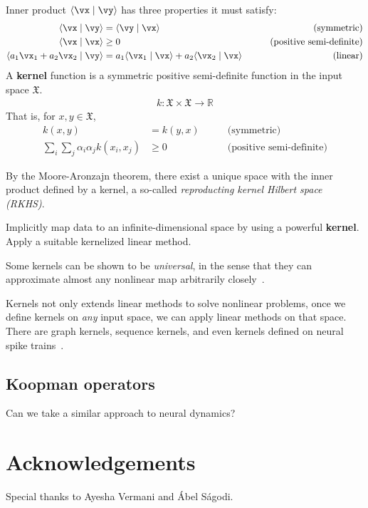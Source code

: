 \documentclass[a4paper,11pt]{exam}
\newcounter{ct}
\newcommand{\braket}[2]{\ensuremath{\langle#1\mid#2\rangle}}
\newcommand{\field}[1]{\ensuremath{\mathbb{#1}}}
\newcommand{\reals}{\field{R}}
\newcommand{\inputSpace}{\ensuremath{\mathfrak{X}}}
\begin{document}
\begin{questions}
Inner product $\braket{\vx}{\vy}$ has three properties it must satisfy:
\begin{align}\label{eq:innerproduct}
	\braket{\vx}{\vy} &= \braket{\vy}{\vx} \qquad &\text{(symmetric)} \\
	\braket{\vx}{\vx} &\geq 0 \qquad &\text{(positive semi-definite)}\\
	\braket{a_1 \vx_1 + a_2 \vx_2}{\vy} &= a_1 \braket{\vx_1}{\vx} + a_2 \braket{\vx_2}{\vx} \qquad &\text{(linear)}
\end{align}
A \textbf{kernel} function is a symmetric positive semi-definite function in the input space $\inputSpace$.
\begin{align}
	k: \inputSpace \times \inputSpace \to \reals
\end{align}
That is, for $x, y \in \inputSpace$,
\begin{align}\label{eq:kernelreq}
	k(x,y) &= k(y,x) \qquad &\text{(symmetric)} \\
	\sum_i \sum_j \alpha_i \alpha_j k(x_i,x_j) &\geq 0    \qquad &\text{(positive semi-definite)}
\end{align}

By the Moore-Aronzajn theorem\citep{Aronszajn1950}, there exist a unique space with the inner product defined by a kernel, a so-called \emph{reproducting kernel Hilbert space (RKHS)}.

\begin{tcolorbox}[colback=black!1!,title=Kernel Trick!]
Implicitly map data to an infinite-dimensional space by using a powerful \textbf{kernel}.
Apply a suitable kernelized linear method.
\end{tcolorbox}

Some kernels can be shown to be \emph{universal}, in the sense that they can approximate almost any nonlinear map arbitrarily closely~\citep{Scholkopf2002}.

Kernels not only extends linear methods to solve nonlinear problems, once we define kernels on \emph{any} input space, we can apply linear methods on that space.
There are graph kernels, sequence kernels, and even kernels defined on neural spike trains~\citep{Park2012a,Park2013a}.

\subsection{Koopman operators}
Can we take a similar approach to neural dynamics?

\end{questions}

\newpage
\section*{Acknowledgements}
Special thanks to Ayesha Vermani and \'Abel S\'agodi.



\end{document}
